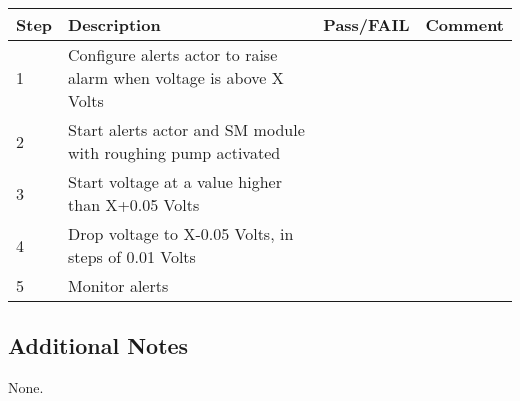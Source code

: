 \begin{table}[H]
    \begin{tabular}{|l| p{5cm} |l| p{5cm} |}
    \hline
    {\bf Step} & {\bf Description} & {\bf Pass/FAIL} & {\bf Comment}  \\ \hline
    1 & Configure alerts actor to raise alarm when voltage is above X Volts &  &  \\ \hline
    2 & Start alerts actor and SM module with roughing pump activated &  & \\ \hline
    3 & Start voltage at a value higher than X+0.05 Volts &  & \\ \hline
    4 & Drop voltage to X-0.05 Volts, in steps of 0.01 Volts &  & \\ \hline
    5 & Monitor alerts &  & \\ \hline
    \end{tabular}
\end{table}


\subsection{Additional Notes}

None.
